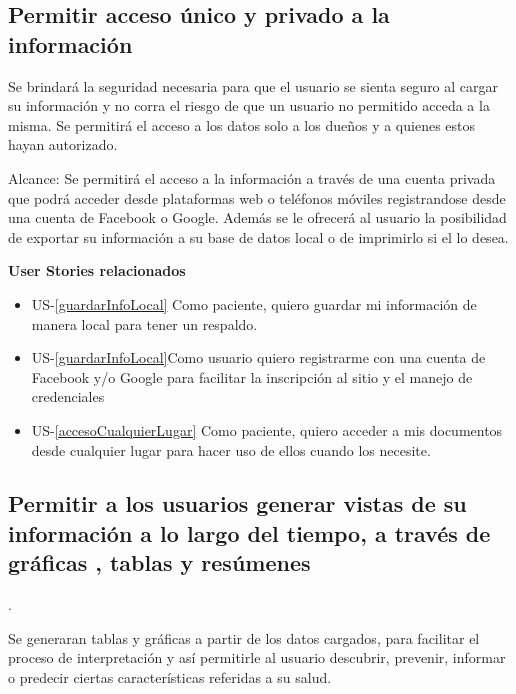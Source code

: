 \subsection{Permitir acceso único y privado a la información}

Se brindará la seguridad necesaria para que el usuario se sienta seguro al cargar su información y no corra el riesgo de que un usuario no permitido acceda a la misma.
Se permitirá el acceso a los datos solo a los dueños y a quienes estos hayan autorizado.

Alcance:
Se permitirá el acceso a la información a través de una cuenta privada que podrá acceder desde plataformas web o teléfonos móviles registrandose desde una cuenta de Facebook o Google. Además se le ofrecerá al usuario la posibilidad de exportar su información a su base de datos local o de imprimirlo si el lo desea.

        \textbf{User Stories relacionados}
        \begin{itemize}
			\item US-\ref{guardarInfoLocal}  Como paciente, quiero guardar mi información de manera local para tener un respaldo.
			\item US-\ref{guardarInfoLocal}Como usuario quiero registrarme con una cuenta de Facebook y/o Google para facilitar la inscripción al sitio y el manejo de credenciales
			\item US-\ref{accesoCualquierLugar}  Como paciente, quiero acceder a mis documentos desde cualquier lugar para hacer uso de ellos cuando los necesite.            
		\end{itemize}


\subsection{Permitir a los usuarios generar vistas de su información a lo largo del tiempo, a través de gráficas , tablas y resúmenes}.

	Se generaran tablas y gráficas a partir de los datos cargados, para facilitar el proceso de interpretación y así permitirle al usuario descubrir, prevenir, informar o predecir ciertas características referidas a su salud.


